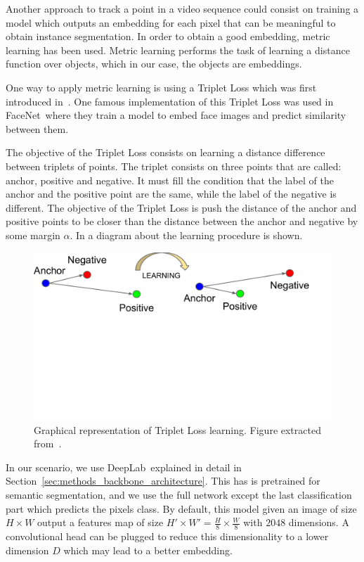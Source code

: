 Another approach to track a point in a video sequence could consist on training a model which outputs an embedding for each pixel that can be meaningful to obtain instance segmentation.
In order to obtain a good embedding, metric learning has been used.
Metric learning performs the task of learning a distance function over objects, which in our case, the objects are embeddings.

One way to apply metric learning is using a Triplet Loss which was first introduced in~\metriclearning.
One famous implementation of this Triplet Loss was used in FaceNet~\facenet where they train a model to embed face images and predict similarity between them.

The objective of the Triplet Loss consists on learning a distance difference between triplets of points.
The triplet consists on three points that are called: anchor, positive and negative.
It must fill the condition that the label of the anchor and the positive point are the same, while the label of the negative is different.
The objective of the Triplet Loss is push the distance of the anchor and positive points to be closer than the distance between the anchor and negative by some margin $\alpha$.
In  a diagram about the learning procedure is shown.

\begin{figure}[h]
  \centering
  \includegraphics[trim=1cm 10cm 2.5cm 0cm, width=0.7\linewidth]{figures/methods/triplet_loss/triplet_viz.pdf}
  \caption{
    Graphical representation of Triplet Loss learning.
    Figure extracted from~\cite{schroff2015facenet}. }
  \label{fig:triplet_loss_viz}
\end{figure}

In our scenario, we use DeepLab~\deeplab explained in detail in Section~\ref{sec:methods_backbone_architecture}.
This has is pretrained for semantic segmentation, and we use the full network except the last classification part which predicts the pixels class.
By default, this model given an image of size $H \times W$ output a features map of size $H' \times W' = \frac{H}{8} \times \frac{W}{8}$ with $2048$ dimensions.
A convolutional head can be plugged to reduce this dimensionality to a lower dimension $D$ which may lead to a better embedding.

